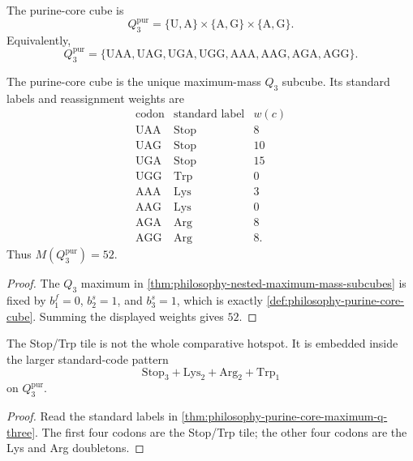 \begin{definition}
\label{def:philosophy-purine-core-cube}
The purine-core cube is
$$
  Q_{3}^{\mathrm{pur}}
  =
  \{\mathrm{U},\mathrm{A}\}
  \times
  \{\mathrm{A},\mathrm{G}\}
  \times
  \{\mathrm{A},\mathrm{G}\}.
$$
Equivalently,
$$
  Q_{3}^{\mathrm{pur}}
  =
  \{\mathrm{UAA},\mathrm{UAG},\mathrm{UGA},\mathrm{UGG},
    \mathrm{AAA},\mathrm{AAG},\mathrm{AGA},\mathrm{AGG}\}.
$$
\end{definition}

\begin{theorem}
\label{thm:philosophy-purine-core-maximum-q-three}
The purine-core cube is the unique maximum-mass $Q_{3}$ subcube. Its
standard labels and reassignment weights are
$$
\begin{array}{c|c|r}
  \text{codon} & \text{standard label} & w(c)\\
\hline
  \mathrm{UAA} & \mathrm{Stop} & 8\\
  \mathrm{UAG} & \mathrm{Stop} & 10\\
  \mathrm{UGA} & \mathrm{Stop} & 15\\
  \mathrm{UGG} & \mathrm{Trp} & 0\\
  \mathrm{AAA} & \mathrm{Lys} & 3\\
  \mathrm{AAG} & \mathrm{Lys} & 0\\
  \mathrm{AGA} & \mathrm{Arg} & 8\\
  \mathrm{AGG} & \mathrm{Arg} & 8.
\end{array}
$$
Thus $M(Q_{3}^{\mathrm{pur}})=52$.
\end{theorem}
\begin{proof}
The $Q_{3}$ maximum in
\autoref{thm:philosophy-nested-maximum-mass-subcubes} is fixed by
$b_{1}^{f}=0$, $b_{2}^{s}=1$, and $b_{3}^{s}=1$, which is exactly
\autoref{def:philosophy-purine-core-cube}. Summing the displayed weights
gives $52$.
\end{proof}

\begin{corollary}
\label{cor:philosophy-stop-trp-inside-purine-core}
The Stop/Trp tile is not the whole comparative hotspot. It is embedded
inside the larger standard-code pattern
$$
  \mathrm{Stop}_{3}+\mathrm{Lys}_{2}+\mathrm{Arg}_{2}+\mathrm{Trp}_{1}
$$
on $Q_{3}^{\mathrm{pur}}$.
\end{corollary}
\begin{proof}
Read the standard labels in
\autoref{thm:philosophy-purine-core-maximum-q-three}. The first four
codons are the Stop/Trp tile; the other four codons are the Lys and Arg
doubletons.
\end{proof}

